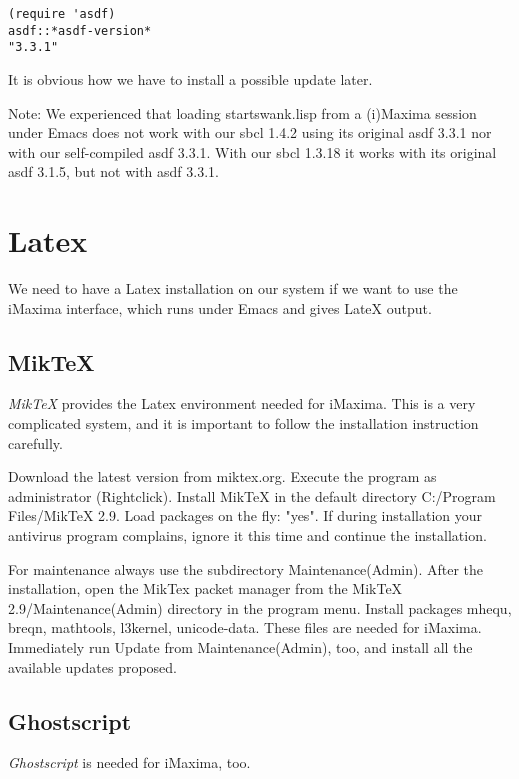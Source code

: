\documentclass[../Maxima_Workbook.tex]{subfiles}
\begin{document}
\begin{lstlisting}[style=lisp]
(require 'asdf)
asdf::*asdf-version*
"3.3.1"
\end{lstlisting}

It is obvious how we have to install a possible update later.

\lz Note: We experienced that loading startswank.lisp from a (i)Maxima session under Emacs does not work with our sbcl 1.4.2 using its original asdf 3.3.1 nor with our self-compiled asdf 3.3.1. With our sbcl 1.3.18 it works with its original asdf 3.1.5, but not with asdf 3.3.1. 

\section{Latex}

We need to have a Latex installation on our system if we want to use the iMaxima interface, which runs under Emacs and gives LateX output.

\subsection{MikTeX}

\emph{MikTeX} provides the Latex environment needed for iMaxima. This is a very complicated system, and it is important to follow the installation instruction carefully.

\lz Download the latest version from miktex.org. Execute the program as administrator (Rightclick). Install MikTeX in the default directory C:/Program Files/MikTeX 2.9. Load packages on the fly: "yes". If during installation your antivirus program complains, ignore it this time and continue the installation.

\lz For maintenance always use the subdirectory Maintenance(Admin). After the installation, open the MikTex packet manager from the MikTeX 2.9/Maintenance(Admin) directory in the program menu. Install packages mhequ, breqn, mathtools, l3kernel, unicode-data. These files are needed for iMaxima. Immediately run Update from Maintenance(Admin), too, and install all the available updates proposed.

\subsection{Ghostscript}

\emph{Ghostscript} is needed for iMaxima, too.
\end{document}
